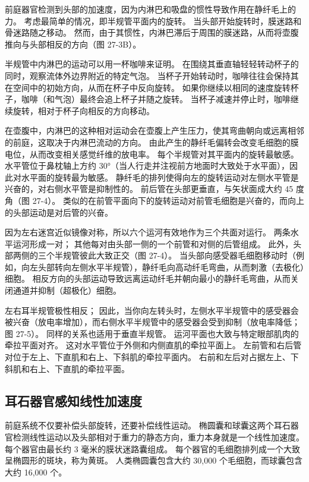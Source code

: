 前庭器官检测到头部的加速度，因为内淋巴和吸盘的惯性导致作用在静纤毛上的力。 考虑最简单的情况，即半规管平面内的旋转。 当头部开始旋转时，膜迷路和骨迷路随之移动。 然而，由于其惯性，内淋巴滞后于周围的膜迷路，从而将壶腹推向与头部相反的方向（图 27-3B）。

半规管中内淋巴的运动可以用一杯咖啡来证明。 在围绕其垂直轴轻轻转动杯子的同时，观察流体外边界附近的特定气泡。 当杯子开始转动时，咖啡往往会保持其在空间中的初始方向，从而在杯子中反向旋转。 如果你继续以相同的速度旋转杯子，咖啡（和气泡）最终会追上杯子并随之旋转。 当杯子减速并停止时，咖啡继续旋转，相对于杯子向相反的方向移动。

在壶腹中，内淋巴的这种相对运动会在壶腹上产生压力，使其弯曲朝向或远离相邻的前庭，这取决于内淋巴流动的方向。 由此产生的静纤毛偏转会改变毛细胞的膜电位，从而改变相关感觉纤维的放电率。 每个半规管对其平面内的旋转最敏感。 水平管位于鼻枕轴上方约 30°（当人行走并注视前方地面时大致处于水平面），因此对水平面的旋转最为敏感。 静纤毛的排列使得向左的旋转运动对左侧水平管是兴奋的，对右侧水平管是抑制性的。 前后管在头部更垂直，与矢状面成大约 45 度角（图 27-4）。 类似的在前管平面向下的旋转运动对前管毛细胞是兴奋的，而向上的头部运动是对后管的兴奋。

因为左右迷宫近似镜像对称，所以六个运河有效地作为三个共面对运行。 两条水平运河形成一对； 其他每对由头部一侧的一个前管和对侧的后管组成。 此外，头部两侧的三个半规管彼此大致正交（图 27-4）。 当头部向感受器毛细胞移动时（例如，向左头部转向左侧水平半规管），静纤毛向高动纤毛弯曲，从而刺激（去极化）细胞。 相反方向的头部运动导致远离运动纤毛并朝向最小的静纤毛弯曲，从而关闭通道并抑制（超极化）细胞。

左右耳半规管极性相反； 因此，当你向左转头时，左侧水平半规管中的感受器会被兴奋（放电率增加），而右侧水平半规管中的感受器会受到抑制（放电率降低；图 27-5）。 同样的关系也适用于垂直半规管。 运河平面也大致与特定眼部肌肉的牵拉平面对齐。 这对水平管位于外侧和内侧直肌的牵拉平面上。 左前管和右后管对位于左上、下直肌和右上、下斜肌的牵拉平面内。 右前和左后对占据左上、下斜肌和右上、下直肌的牵拉平面。



\subsection{耳石器官感知线性加速度}
前庭系统不仅要补偿头部旋转，还要补偿线性运动。 椭圆囊和球囊这两个耳石器官检测线性运动以及头部相对于重力的静态方向，重力本身就是一个线性加速度。 每个器官由最长约 3 毫米的膜状迷路囊组成。 每个器官的毛细胞排列成一个大致呈椭圆形的斑块，称为黄斑。 人类椭圆囊包含大约 30,000 个毛细胞，而球囊包含大约 16,000 个。

